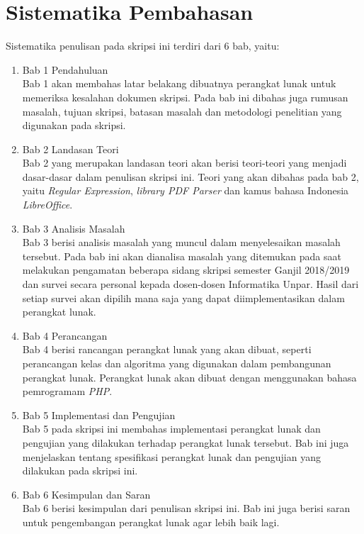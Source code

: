 \section{Sistematika Pembahasan}
\label{sec:sispem}
Sistematika penulisan pada skripsi ini terdiri dari 6 bab, yaitu:

\begin{enumerate}
	\item Bab 1 Pendahuluan
	\\
	Bab 1 akan membahas latar belakang dibuatnya perangkat lunak untuk memeriksa kesalahan dokumen skripsi. Pada bab ini dibahas juga rumusan masalah, tujuan skripsi, batasan masalah dan metodologi penelitian yang digunakan pada skripsi.

	\item Bab 2 Landasan Teori
	\\
	Bab 2 yang merupakan landasan teori akan berisi teori-teori yang menjadi dasar-dasar dalam penulisan skripsi ini. Teori yang akan dibahas pada bab 2, yaitu \textit{Regular Expression}, \textit{library PDF Parser} dan kamus bahasa Indonesia \textit{LibreOffice}.
	
	\item Bab 3 Analisis Masalah
	\\
	Bab 3 berisi analisis masalah yang muncul dalam menyelesaikan masalah tersebut. Pada bab ini akan dianalisa masalah yang ditemukan pada saat melakukan pengamatan beberapa sidang skripsi semester Ganjil 2018/2019 dan survei secara personal kepada dosen-dosen Informatika Unpar. Hasil dari setiap survei akan dipilih mana saja yang dapat diimplementasikan dalam perangkat lunak.
	
	\item Bab 4 Perancangan
	\\
	Bab 4 berisi rancangan perangkat lunak yang akan dibuat, seperti perancangan kelas dan algoritma yang digunakan dalam pembangunan perangkat lunak. Perangkat lunak akan dibuat dengan menggunakan bahasa pemrogramam \textit{PHP}.
	
	\item Bab 5 Implementasi dan Pengujian
	\\
	Bab 5 pada skripsi ini membahas implementasi perangkat lunak dan pengujian yang dilakukan terhadap perangkat lunak tersebut. Bab ini juga menjelaskan tentang spesifikasi perangkat lunak dan pengujian yang dilakukan pada skripsi ini.
	
	\item Bab 6 Kesimpulan dan Saran
	\\
	Bab 6 berisi kesimpulan dari penulisan skripsi ini. Bab ini juga berisi saran untuk pengembangan perangkat lunak agar lebih baik lagi.
\end{enumerate}